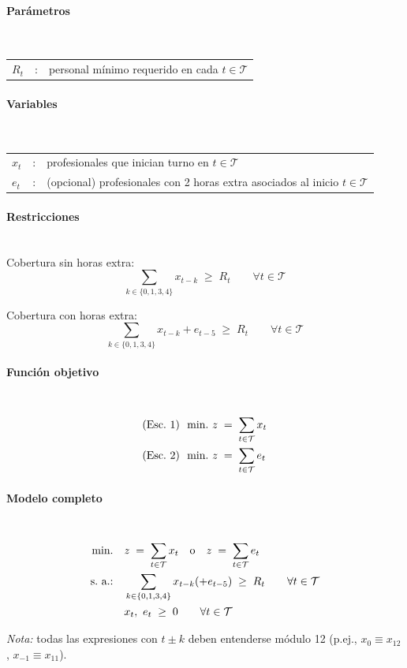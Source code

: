 \paragraph{Parámetros}\mbox{}\\
\begin{tabular}{l c l}
    $R_t$ & : & personal mínimo requerido en cada $t\in\mathcal{T}$\\
\end{tabular}

\paragraph{Variables}\mbox{}\\
\begin{tabular}{l c l}
    $x_t$ & : & profesionales que inician turno en $t\in\mathcal{T}$\\
    $e_t$ & : & (opcional) profesionales con 2 horas extra asociados al inicio $t\in\mathcal{T}$\\
\end{tabular}

\paragraph{Restricciones}\mbox{}\\
Cobertura sin horas extra:
\begin{equation}
    \sum_{k\in\{0,1,3,4\}} x_{t-k} \;\geq\; R_t \qquad \forall t\in\mathcal{T}
\end{equation}

Cobertura con horas extra:
\begin{equation}
    \sum_{k\in\{0,1,3,4\}} x_{t-k} + e_{t-5} \;\geq\; R_t \qquad \forall t\in\mathcal{T}
\end{equation}

\paragraph{Función objetivo}\mbox{}\\
\begin{align}
& \mbox{(Esc.~1) }\ \mbox{min.}\ z \;=\; \sum_{t\in\mathcal{T}} x_t \notag \\
& \mbox{(Esc.~2) }\ \mbox{min.}\ z \;=\; \sum_{t\in\mathcal{T}} e_t \notag
\end{align}

\paragraph{Modelo completo}\mbox{}\\
\begin{align}
\mbox{min.}\quad & z \;=\; \sum_{t\in\mathcal{T}} x_t \quad \text{o} \quad z \;=\; \sum_{t\in\mathcal{T}} e_t \notag \\
\mbox{s.\ a.:}\quad 
& \sum_{k\in\{0,1,3,4\}} x_{t-k} (+ e_{t-5}) \;\geq\; R_t \qquad \forall t\in\mathcal{T} \notag \\
& x_t,\ e_t \;\geq\; 0 \qquad \forall t\in\mathcal{T} \notag
\end{align}

\medskip
\textit{Nota:} todas las expresiones con $t\pm k$ deben entenderse módulo 12 (p.ej., $x_{0}\equiv x_{12}$, $x_{-1}\equiv x_{11}$).

